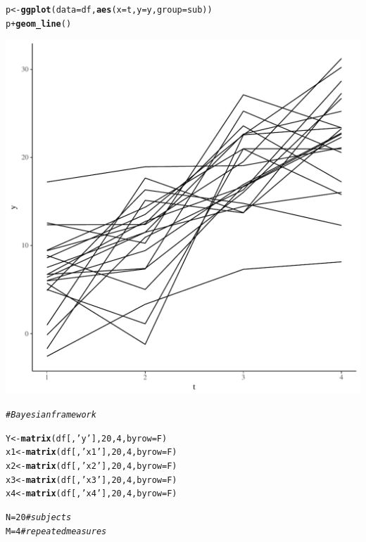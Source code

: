 \documentclass[11pt,a4paper,twoside]{book}
\makeatletter
\def\maxwidth{ %
  \ifdim\Gin@nat@width>\linewidth
    \linewidth
  \else
    \Gin@nat@width
  \fi
}
\newcommand{\hlnum}[1]{\textcolor[rgb]{0.686,0.059,0.569}{#1}}%
\newcommand{\hlstr}[1]{\textcolor[rgb]{0.192,0.494,0.8}{#1}}%
\newcommand{\hlcom}[1]{\textcolor[rgb]{0.678,0.584,0.686}{\textit{#1}}}%
\newcommand{\hlopt}[1]{\textcolor[rgb]{0,0,0}{#1}}%
\newcommand{\hlstd}[1]{\textcolor[rgb]{0.345,0.345,0.345}{#1}}%
\newcommand{\hlkwb}[1]{\textcolor[rgb]{0.69,0.353,0.396}{#1}}%
\newcommand{\hlkwc}[1]{\textcolor[rgb]{0.333,0.667,0.333}{#1}}%
\newcommand{\hlkwd}[1]{\textcolor[rgb]{0.737,0.353,0.396}{\textbf{#1}}}%
\newenvironment{kframe}{%
 \def\at@end@of@kframe{}%
 \ifinner\ifhmode%
  \def\at@end@of@kframe{\end{minipage}}%
  \begin{minipage}{\columnwidth}%
 \fi\fi%
 \def\FrameCommand##1{\hskip\@totalleftmargin \hskip-\fboxsep
 \colorbox{shadecolor}{##1}\hskip-\fboxsep
     \hskip-\linewidth \hskip-\@totalleftmargin \hskip\columnwidth}%
 \MakeFramed {\advance\hsize-\width
   \@totalleftmargin\z@ \linewidth\hsize
   \@setminipage}}%
 {\par\unskip\endMakeFramed%
 \at@end@of@kframe}
\newenvironment{knitrout}{}{} %
\makeatother
\begin{document}
\begin{knitrout}
\begin{kframe}
\begin{alltt}
\hlstd{p} \hlkwb{<-} \hlkwd{ggplot}\hlstd{(}\hlkwc{data} \hlstd{= df,} \hlkwd{aes}\hlstd{(}\hlkwc{x} \hlstd{= t,} \hlkwc{y} \hlstd{= y,} \hlkwc{group} \hlstd{= sub))}
\hlstd{p} \hlopt{+} \hlkwd{geom_line}\hlstd{()}
\end{alltt}
\end{kframe}
\includegraphics[width=\maxwidth]{figure/ch04_figsimdata_repeated_unstruct-1} 
\begin{kframe}\begin{alltt}
\hlcom{# Bayesian framework}

\hlstd{Y} \hlkwb{<-} \hlkwd{matrix}\hlstd{(df[,}\hlstr{'y'}\hlstd{],} \hlnum{20}\hlstd{,} \hlnum{4}\hlstd{,} \hlkwc{byrow}\hlstd{=F)}
\hlstd{x1} \hlkwb{<-} \hlkwd{matrix}\hlstd{(df[,}\hlstr{'x1'}\hlstd{],} \hlnum{20}\hlstd{,} \hlnum{4}\hlstd{,} \hlkwc{byrow}\hlstd{=F)}
\hlstd{x2} \hlkwb{<-} \hlkwd{matrix}\hlstd{(df[,}\hlstr{'x2'}\hlstd{],} \hlnum{20}\hlstd{,} \hlnum{4}\hlstd{,} \hlkwc{byrow}\hlstd{=F)}
\hlstd{x3} \hlkwb{<-} \hlkwd{matrix}\hlstd{(df[,}\hlstr{'x3'}\hlstd{],} \hlnum{20}\hlstd{,} \hlnum{4}\hlstd{,} \hlkwc{byrow}\hlstd{=F)}
\hlstd{x4} \hlkwb{<-} \hlkwd{matrix}\hlstd{(df[,}\hlstr{'x4'}\hlstd{],} \hlnum{20}\hlstd{,} \hlnum{4}\hlstd{,} \hlkwc{byrow}\hlstd{=F)}

\hlstd{N} \hlkwb{=} \hlnum{20} \hlcom{#subjects}
\hlstd{M} \hlkwb{=} \hlnum{4} \hlcom{# repeated measures}
\end{alltt}
\end{kframe}
\end{knitrout}
\end{document}
